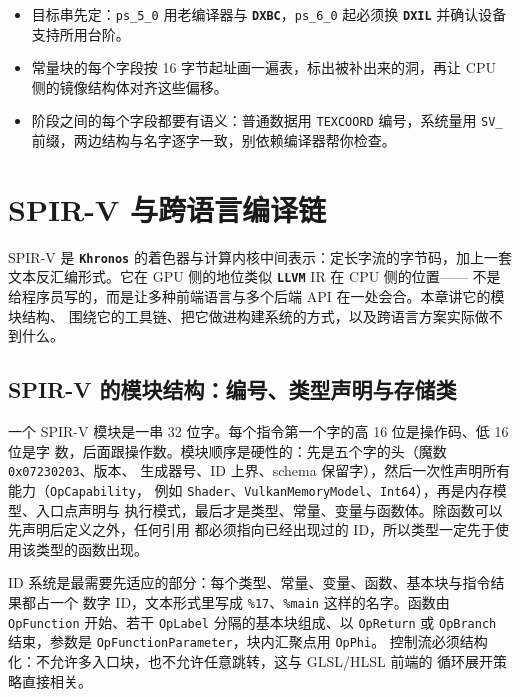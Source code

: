 \documentclass[12pt,a4paper,fontset=fandol]{ctexbook}
\newcommand{\Tp}[1]{\texttt{#1}}
\newcommand{\Bk}{\discretionary{}{}{}}
\newcommand{\Lib}[1]{\textbf{\texttt{#1}}}
\newcommand{\Lang}[1]{\textsf{#1}}
\newcommand{\DomCPU}{\Lang{CPU}}
\newcommand{\DomGPU}{\Lang{GPU}}
\newcommand{\GSL}{\Lang{GLSL}}
\newcommand{\HSL}{\Lang{HLSL}}
\newcommand{\SPIV}{\Lang{SPIR-V}}
\begin{document}
\begin{bestpractice}[title={从 \GSL{} 迁到 \HSL{} 的三条检查}]
\begin{itemize}
\item 目标串先定：\Tp{ps\_5\_0} 用老编译器与 \Lib{DXBC}，\Tp{ps\_6\_0} 起必须换
\Lib{DXIL} 并确认设备支持所用台阶。
\item 常量块的每个字段按 16 字节起址画一遍表，标出被补出来的洞，再让
\DomCPU{} 侧的镜像结构体对齐这些偏移。
\item 阶段之间的每个字段都要有语义：普通数据用 \Tp{TEXCOORD} 编号，系统量用
\Tp{SV\_} 前缀，两边结构与名字逐字一致，别依赖编译器帮你检查。
\end{itemize}
\end{bestpractice}

\chapter{SPIR-V 与跨语言编译链}
\label{ch:ch07-spirv-toolchain}

\SPIV{} 是 \Lib{Khronos} 的着色器与计算内核中间表示：定长字流的字节码，加上一套
文本反汇编形式。它在 \DomGPU{} 侧的地位类似 \Lib{LLVM} IR 在 \DomCPU{} 侧的位置——
不是给程序员写的，而是让多种前端语言与多个后端 API 在一处会合。本章讲它的模块结构、
围绕它的工具链、把它做进构建系统的方式，以及跨语言方案实际做不到什么。

\section{\SPIV{} 的模块结构：编号、类型声明与存储类}

一个 \SPIV{} 模块是一串 32 位字。每个指令第一个字的高 16 位是操作码、低 16 位是字
数，后面跟操作数。模块顺序是硬性的：先是五个字的头（魔数 \Tp{0x07230203}、版本、
生成器号、ID 上界、schema 保留字），然后一次性声明所有能力（\Tp{OpCapability}，
例如 \Tp{Shader}、\Tp{VulkanMemoryModel}、\Tp{Int64}），再是内存模型、入口点声明与
执行模式，最后才是类型、常量、变量与函数体。除函数可以先声明后定义之外，任何引用
都必须指向已经出现过的 ID，所以类型一定先于使用该类型的函数出现。

ID 系统是最需要先适应的部分：每个类型、常量、变量、函数、基本块与指令结果都占一个
数字 ID，文本形式里写成 \Tp{\%17}、\Tp{\%main} 这样的名字。函数由 \Tp{OpFunction}
开始、若干 \Tp{OpLabel} 分隔的基本块组成、以 \Tp{OpReturn} 或
\Tp{OpBranch} 结束，参数是 \Tp{OpFunctionParameter}，块内汇聚点用 \Tp{OpPhi}。
控制流必须结构化：不允许多入口块，也不允许任意跳转，这与 \GSL{}/{\Bk}\HSL{} 前端的
循环展开策略直接相关。
\end{document}
